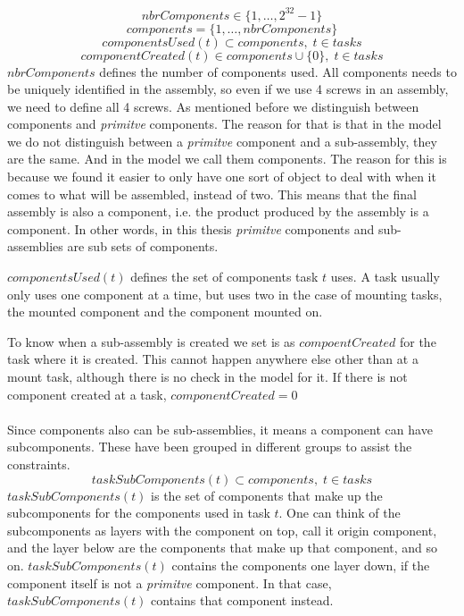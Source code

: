  \begin{equation}\label{eq:6}
 nbrComponents \in \{1 , \ldots , 2^{32}-1\}
 \end{equation}
 \begin{equation}\label{eq:13}
 components = \{1 , \ldots , nbrComponents\}
 \end{equation}
 \begin{equation}\label{eq:25}
 componentsUsed(t) \subset components, \; t \in tasks
 \end{equation}
 \begin{equation}\label{eq:componentCreated}
 componentCreated(t) \in components \cup \{0\}, \; t \in tasks
 \end{equation}
 $nbrComponents$ defines the number of components used. All components needs to be uniquely identified in the assembly, so even if we use 4 screws in an assembly, we need to define all 4 screws. As mentioned before we distinguish between components and \emph{primitve} components. The reason for that is that in the model we do not distinguish between a \emph{primitve} component and a sub-assembly, they are the same. And in the model we call them components. The reason for this is because we found it easier to only have one sort of object to deal with when it comes to what will be assembled, instead of two. This means that the final assembly is also a component, i.e. the product produced by the assembly is a component. In other words, in this thesis \emph{primitve} components and sub-assemblies are sub sets of components.
 
 $componentsUsed(t)$ defines the set of components task $t$ uses. A task usually only uses one component at a time, but uses two in the case of mounting tasks, the mounted component and the component mounted on.
 
 To know when a sub-assembly is created we set is as $compoentCreated$ for the task where it is created. This cannot happen anywhere else other than at a mount task, although there is no check in the model for it. If there is not component created at a task, $componentCreated=0$
 \\\\
 Since components also can be sub-assemblies, it means a component can have subcomponents. These have been grouped in different groups to assist the constraints.
 \begin{equation}\label{eq:53}
 taskSubComponents(t) \subset components, \; t \in tasks\end{equation}
 $taskSubComponents(t)$ is the set of components that make up the subcomponents for the components used in task $t$. One can think of the subcomponents as layers with the component on top, call it origin component, and the layer below are the components that make up that component, and so on. $taskSubComponents(t)$ contains the components one layer down, if the component itself is not a \emph{primitve} component. In that case, $taskSubComponents(t)$ contains that component instead.
 
